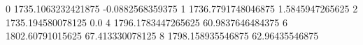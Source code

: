 0 1735.1063232421875 -0.0882568359375
1 1736.7791748046875 1.5845947265625
2 1735.194580078125 0.0
4 1796.1783447265625 60.9837646484375
6 1802.60791015625 67.413330078125
8 1798.158935546875 62.96435546875
